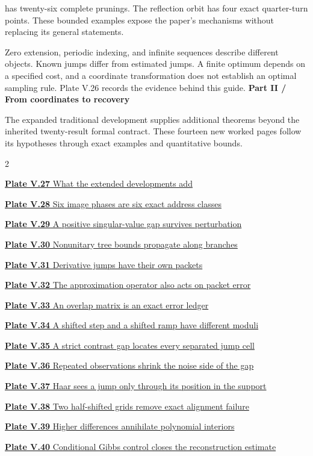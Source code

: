 \documentclass[11pt,letterpaper]{article}
\newcommand{\head}[1]{\par\vspace{2pt}{\sffamily\bfseries\normalsize #1}\par\vspace{1pt}}
\begin{document}
has twenty-six complete prunings. The reflection orbit has four exact
quarter-turn points. These bounded examples expose the paper's mechanisms
without replacing its general statements.
\head{Read the hypotheses with the picture}
Zero extension, periodic indexing, and infinite sequences describe different
objects. Known jumps differ from estimated jumps. A finite optimum depends
on a specified cost, and a coordinate transformation does not establish an
optimal sampling rule. Plate V.26 records the evidence behind this guide.
\clearpage
{}
{\sffamily\bfseries\Large\color{accent}Part II / From coordinates to recovery}\par\medskip
The expanded traditional development supplies additional theorems beyond the
inherited twenty-result formal contract. These fourteen new worked pages
follow its hypotheses through exact examples and quantitative bounds.
\medskip
\begin{multicols}{2}\raggedright
{\small\noindent\hyperlink{vpage27}{\textbf{Plate V.27} What the extended developments add}\par\medskip}
{\small\noindent\hyperlink{vpage28}{\textbf{Plate V.28} Six image phases are six exact address classes}\par\medskip}
{\small\noindent\hyperlink{vpage29}{\textbf{Plate V.29} A positive singular-value gap survives perturbation}\par\medskip}
{\small\noindent\hyperlink{vpage30}{\textbf{Plate V.30} Nonunitary tree bounds propagate along branches}\par\medskip}
{\small\noindent\hyperlink{vpage31}{\textbf{Plate V.31} Derivative jumps have their own packets}\par\medskip}
{\small\noindent\hyperlink{vpage32}{\textbf{Plate V.32} The approximation operator also acts on packet error}\par\medskip}
{\small\noindent\hyperlink{vpage33}{\textbf{Plate V.33} An overlap matrix is an exact error ledger}\par\medskip}
{\small\noindent\hyperlink{vpage34}{\textbf{Plate V.34} A shifted step and a shifted ramp have different moduli}\par\medskip}
{\small\noindent\hyperlink{vpage35}{\textbf{Plate V.35} A strict contrast gap locates every separated jump cell}\par\medskip}
{\small\noindent\hyperlink{vpage36}{\textbf{Plate V.36} Repeated observations shrink the noise side of the gap}\par\medskip}
{\small\noindent\hyperlink{vpage37}{\textbf{Plate V.37} Haar sees a jump only through its position in the support}\par\medskip}
{\small\noindent\hyperlink{vpage38}{\textbf{Plate V.38} Two half-shifted grids remove exact alignment failure}\par\medskip}
{\small\noindent\hyperlink{vpage39}{\textbf{Plate V.39} Higher differences annihilate polynomial interiors}\par\medskip}
{\small\noindent\hyperlink{vpage40}{\textbf{Plate V.40} Conditional Gibbs control closes the reconstruction estimate}\par\medskip}
\end{multicols}
\end{document}

